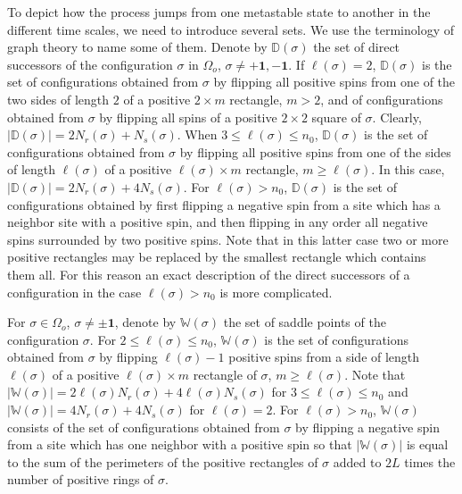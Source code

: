 \documentclass[reqno]{amsart}
\begin{document}
To depict how the process jumps from one metastable state to another
in the different time scales, we need to introduce several sets. We
use the terminology of graph theory to name some of them.  Denote by
${{\mathbb D}}(\sigma)$ the set of direct successors of the configuration
$\sigma$ in $\Omega_o$, $\sigma \not = + {{\mathbf 1}}, - {{\mathbf 1}}$. If $\ell
(\sigma) =2$, ${{\mathbb D}}(\sigma)$ is the set of configurations obtained
from $\sigma$ by flipping all positive spins from one of the two sides
of length $2$ of a positive $2 \times m$ rectangle, $m> 2$, and of
configurations obtained from $\sigma$ by flipping all spins of a
positive $2\times 2$ square of $\sigma$.  Clearly, $|{{\mathbb D}}(\sigma)| =
2N_r(\sigma) + N_s(\sigma)$.  When $3\le \ell (\sigma) \le n_0$, ${{\mathbb D}}(\sigma)$ is the set of configurations obtained from $\sigma$ by
flipping all positive spins from one of the sides of length
$\ell(\sigma)$ of a positive $\ell(\sigma) \times m$ rectangle, $m\ge
\ell(\sigma)$. In this case, $|{{\mathbb D}}(\sigma)| = 2N_r(\sigma) + 4
N_s(\sigma)$. For $\ell (\sigma) > n_0$, ${{\mathbb D}}(\sigma)$ is the set of
configurations obtained by first flipping a negative spin from a site
which has a neighbor site with a positive spin, and then flipping in
any order all negative spins surrounded by two positive spins. Note
that in this latter case two or more positive rectangles may be
replaced by the smallest rectangle which contains them all. For this
reason an exact description of the direct successors of a
configuration in the case $\ell (\sigma) > n_0$ is more complicated.

For $\sigma \in \Omega_o$, $\sigma \not = \pm {{\mathbf 1}}$, denote by ${{\mathbb W}}(\sigma)$ the set of saddle points of the configuration $\sigma$. For
$2\le \ell (\sigma) \le n_0$, ${{\mathbb W}}(\sigma)$ is the set of
configurations obtained from $\sigma$ by flipping $\ell(\sigma)-1$
positive spins from a side of length $\ell(\sigma)$ of a positive
$\ell(\sigma) \times m$ rectangle of $\sigma$, $m\ge \ell(\sigma)$.
Note that $|{{\mathbb W}}(\sigma)| = 2 \ell(\sigma) N_r(\sigma) + 4
\ell(\sigma) N_s(\sigma)$ for $3\le \ell (\sigma) \le n_0$ and $|{{\mathbb W}}(\sigma)| = 4N_r(\sigma) + 4 N_s(\sigma)$ for $\ell(\sigma)=2$.  For
$\ell (\sigma) > n_0$, ${{\mathbb W}}(\sigma)$ consists of the set of
configurations obtained from $\sigma$ by flipping a negative spin from
a site which has one neighbor with a positive spin so that $|{{\mathbb W}}(\sigma)|$ is equal to the sum of the perimeters of the positive
rectangles of $\sigma$ added to $2L$ times the number of positive
rings of $\sigma$.
\end{document}
